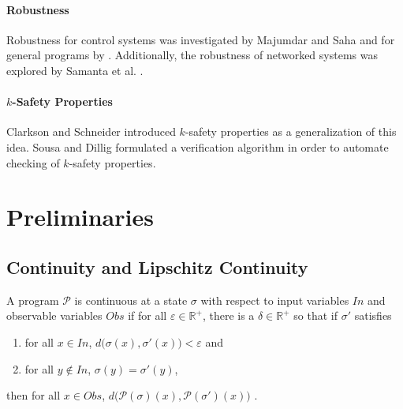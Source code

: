 \documentclass{llncs}
\begin{document}
\paragraph{Robustness} Robustness for control systems was investigated by Majumdar and Saha \cite{majumdar09} and for general programs by \cite{chaudhuri11}.  Additionally, the robustness of networked systems was explored by Samanta et al. \cite{samanta13a}.

\paragraph{\(k\)-Safety Properties} Clarkson and Schneider \cite{clarkson08} introduced \(k\)-safety properties as a generalization of this idea.  Sousa and Dillig \cite{sousa16} formulated a verification algorithm in order to automate checking of \(k\)-safety properties.

\section{Preliminaries}

\subsection{Continuity and Lipschitz Continuity}

%
%
A program \(\mathcal{P}\) is continuous at a state \(\sigma\) with respect to input variables \(In\) and observable variables \(Obs\) if for all \(\varepsilon \in \mathbb{R}^{+}\), there is a \(\delta \in \mathbb{R}^{+}\) so that if \(\sigma'\) satisfies
\begin{enumerate}
    \item for all \(x \in In\), \(d\big(\sigma(x), \sigma'(x)\big) < \varepsilon\) and
    \item for all \(y \notin In\), \(\sigma(y) = \sigma'(y)\),
\end{enumerate}
then for all \(x \in Obs\), \(d\big(\mathcal{P}(\sigma)(x), \mathcal{P}(\sigma')(x)\big)\) \cite{chaudhuri10}.
\end{document}
